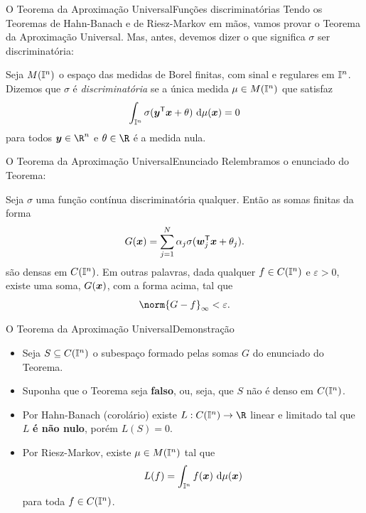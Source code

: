 \documentclass[13pt]{beamer}
\begin{document}
\begin{frame}{O Teorema da Aproximação Universal}{Funções discriminatórias}
    Tendo os Teoremas de Hahn-Banach e de Riesz-Markov em mãos, vamos provar o Teorema da Aproximação Universal.
    Mas, antes, devemos dizer o que significa \( \sigma \) ser discriminatória:
    \begin{defn*}
        Seja \( M ( \mathbb{I}^{ n } ) \) o espaço das medidas de Borel finitas, com sinal e regulares em \( \mathbb{I}^{ n } \).
        Dizemos que \( \sigma \) é \emph{discriminatória} se a única medida \( \mu \in M ( \mathbb{I}^{ n } ) \) que satisfaz
        \begin{equation*}
            \int_{ \mathbb{I}^{ n } } \sigma ( \bm{y}^{ \mathsf{T} } \bm{x} + \theta ) \ \mathrm{d} \mu (\bm{x}) = 0
        \end{equation*}
        para todos \( \bfy \in \R^{ n } \) e \( \theta \in \R \) é a medida nula.
    \end{defn*}
\end{frame}

\begin{frame}{O Teorema da Aproximação Universal}{Enunciado}
    Relembramos o enunciado do Teorema:
    \begin{TAU}
        Seja \( \sigma \) uma função contínua discriminatória qualquer.
        Então as somas finitas da forma
        \begin{equation*}
            G ( \bm{x} ) = \sum_{ j=1 }^{ N } \alpha_{ j } \sigma ( \bm{w}_{ j }^{ \mathsf{T} } \bm{x} + \theta_{ j } )
        .\end{equation*}
        são densas em \( C ( \mathbb{I}^{ n } ) \).
        Em outras palavras, dada qualquer \( f \in C ( \mathbb{I}^{ n } ) \) e \( \varepsilon > 0 \), existe uma soma, \( G ( \bm{x} ) \), com a forma acima, tal que
        \begin{equation*}
            \norm{ G - f }_{ \infty } < \varepsilon
        .\end{equation*}
    \end{TAU}
\end{frame}

\begin{frame}{O Teorema da Aproximação Universal}{Demonstração}
    \begin{itemize}
        \item<1-> Seja \( S \subseteq C ( \mathbb{I}^{ n } ) \) o subespaço formado pelas somas \( G \) do enunciado do Teorema.
        \item<2-> Suponha que o Teorema seja \textbf{falso}, ou, seja, que \( S \) não é denso em \( C ( \mathbb{I}^{ n } ) \).
        \item<3-> Por Hahn-Banach (corolário) existe \( L : C ( \I^{ n } ) \to \R \) linear e limitado tal que \( L \) \textbf{é não nulo}, porém \( L ( S ) = 0 \).
        \item<4-> Por Riesz-Markov, existe \( \mu \in M ( \mathbb{I}^{ n } ) \) tal que
            \begin{equation*}
                L ( f ) = \int_{ \mathbb{I}^{ n } } f ( \bm{x} ) \ \mathrm{d}\mu ( \bm{x} )
            \end{equation*}
            para toda \( f \in C ( \mathbb{I}^{ n } ) \).
    \end{itemize}
\end{frame}
\end{document}
